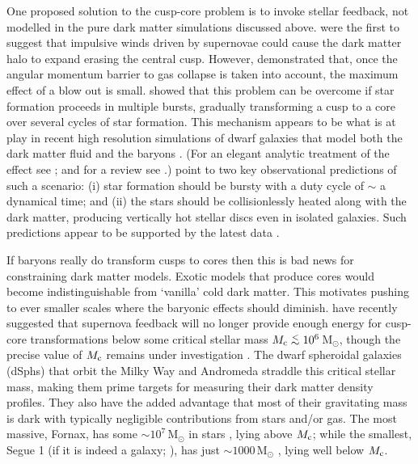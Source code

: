 One proposed solution to the cusp-core problem is to invoke stellar feedback,
not modelled in the pure dark matter simulations discussed
above. \citet{NavarroEkeFrenk1996} were the first to suggest that impulsive
winds driven by supernovae could cause the dark matter halo to expand erasing
the central cusp. However, \citet{GnedinZhao2002} demonstrated that, once the
angular momentum barrier to gas collapse is taken into account, the maximum
effect of a blow out is small. \citet{ReadGilmore2005} showed that this problem
can be overcome if star formation proceeds in multiple bursts, gradually
transforming a cusp to a core over several cycles of star formation. This
mechanism appears to be what is at play in recent high resolution simulations of
dwarf galaxies that model both the dark matter fluid and the baryons
\citep{MashchenkoWadsleyCouchman2008, Governato+2010, PontzenGovernato2012,
  Teyssier+2013}. (For an elegant analytic treatment of the effect see
\citealt{PontzenGovernato2012}; and for a review see
\citealt{PontzenGovernato2014}.) \citet{Teyssier+2013} point to two key
observational predictions of such a scenario: (i) star formation should be
bursty with a duty cycle of $\sim$ a dynamical time; and (ii) the stars should
be collisionlessly heated along with the dark matter, producing vertically hot
stellar discs even in isolated galaxies. Such predictions appear to be supported
by the latest data \citep{2012ApJ...750...33L,Kauffmann2014}.

If baryons really do transform cusps to cores then this is bad news for
constraining dark matter models. Exotic models that produce cores
\citep[e.g.][]{2013MNRAS.431L..20Z} would become indistinguishable from
`vanilla' cold dark matter. This motivates pushing to ever smaller scales where
the baryonic effects should diminish. \citet{Penarrubia+2012} have recently
suggested that supernova feedback will no longer provide enough energy for
cusp-core transformations below some critical stellar mass $M_{\rm c} \simlt
10^6$\,M$_\odot$, though the precise value of $M_{\rm c}$ remains under
investigation \citep[e.g.][]{2014ApJ...789L..17M}. The dwarf spheroidal galaxies
(dSphs) that orbit the Milky Way and Andromeda straddle this critical stellar
mass, making them prime targets for measuring their dark matter density
profiles. They also have the added advantage that most of their gravitating mass
is dark with typically negligible contributions from stars and/or gas. The most
massive, Fornax, has some $\sim 10^7$\,M$_\odot$ in stars
\citep{ColemanDeJong2008}, lying above $M_{\rm c}$; while the smallest, Segue 1
(if it is indeed a galaxy; \citealt{2009MNRAS.398.1771N,2011ApJ...738...55M}),
has just $\sim 1000$\,M$_\odot$ \citep{Belokurov+2007}, lying well below $M_{\rm
  c}$.

